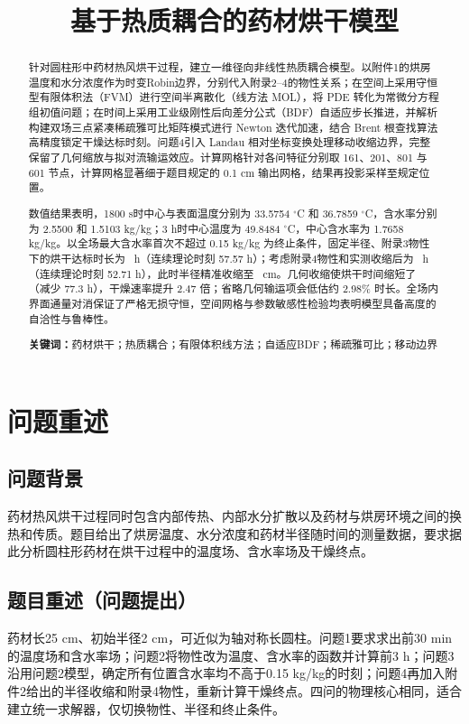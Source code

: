 \documentclass[12pt,a4paper]{ctexart}
\title{\vspace{-2.2em}\bfseries 基于热质耦合的药材烘干模型}
\author{}
\date{}
\begin{document}
\maketitle
\vspace{-4em}

\begin{abstract}
针对圆柱形中药材热风烘干过程，建立一维径向非线性热质耦合模型。以附件1的烘房温度和水分浓度作为时变Robin边界，分别代入附录2--4的物性关系；在空间上采用守恒型有限体积法（FVM）进行空间半离散化（线方法 MOL），将 PDE 转化为常微分方程组初值问题；在时间上采用工业级刚性后向差分公式（BDF）自适应步长推进，并解析构建双场三点紧凑稀疏雅可比矩阵模式进行 Newton 迭代加速，结合 Brent 根查找算法高精度锁定干燥达标时刻。问题4引入 Landau 相对坐标变换处理移动收缩边界，完整保留了几何缩放与拟对流输运效应。计算网格针对各问特征分别取 161、201、801 与 601 节点，计算网格显著细于题目规定的 0.1 cm 输出网格，结果再投影采样至规定位置。

数值结果表明，1800 s时中心与表面温度分别为 33.5754 $^\circ$C 和 36.7859 $^\circ$C，含水率分别为 2.5500 和 1.5103 kg/kg；3 h时中心温度为 49.8484 $^\circ$C，中心含水率为 1.7658 kg/kg。以全场最大含水率首次不超过 0.15 kg/kg 为终止条件，固定半径、附录3物性下的烘干达标时长为 \QThreeDryHours\ h（连续理论时刻 57.57 h）；考虑附录4物性和实测收缩后为 \QFourDryHours\ h（连续理论时刻 52.71 h），此时半径精准收缩至 \QFourDryRadius\ cm。几何收缩使烘干时间缩短了 \ShrinkReduction（减少 77.3 h），干燥速率提升 2.47 倍；省略几何输运项会低估约 2.98\% 时长。全场内界面通量对消保证了严格无损守恒，空间网格与参数敏感性检验均表明模型具备高度的自洽性与鲁棒性。

\textbf{关键词：}药材烘干；热质耦合；有限体积线方法；自适应BDF；稀疏雅可比；移动边界
\end{abstract}

\section{问题重述}
\subsection{问题背景}
药材热风烘干过程同时包含内部传热、内部水分扩散以及药材与烘房环境之间的换热和传质。题目给出了烘房温度、水分浓度和药材半径随时间的测量数据，要求据此分析圆柱形药材在烘干过程中的温度场、含水率场及干燥终点。

\subsection{题目重述（问题提出）}
药材长25 cm、初始半径2 cm，可近似为轴对称长圆柱。问题1要求求出前30 min的温度场和含水率场；问题2将物性改为温度、含水率的函数并计算前3 h；问题3沿用问题2模型，确定所有位置含水率均不高于0.15 kg/kg的时刻；问题4再加入附件2给出的半径收缩和附录4物性，重新计算干燥终点。四问的物理核心相同，适合建立统一求解器，仅切换物性、半径和终止条件。
\end{document}
